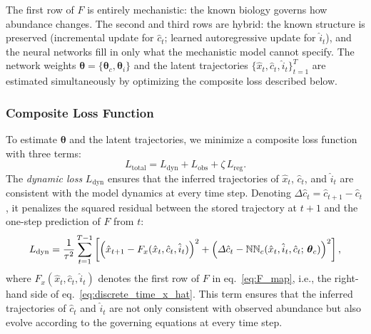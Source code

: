 \documentclass[openacc]{rsproca_new}%
\newcommand{\bs}[1]{\boldsymbol{#1}}
\begin{document}
%
The first row of $F$ is entirely mechanistic: the known biology governs how abundance changes. The second and third rows are hybrid: the known structure is preserved (incremental update for $\hat{c}_t$; learned autoregressive update for $\hat{i}_t$), and the neural networks fill in only what the mechanistic model cannot specify.
The network weights $\bs{\theta} = \{\bs{\theta}_c, \bs{\theta}_i\}$ and the latent trajectories $\{\hat{x}_t, \hat{c}_t, \hat{i}_t\}_{t=1}^{T}$ are estimated simultaneously by optimizing the composite loss described below.
% 
% 
\subsubsection*{Composite Loss Function}
To estimate $\bs{\theta}$ and the latent trajectories, we minimize a
composite loss function with three terms:
%
\begin{equation}
    L_{\mathrm{total}}
        = L_{\mathrm{dyn}} + L_{\mathrm{obs}} + \zeta\,L_{\mathrm{reg}}.
    \label{eq:UDE_Ltotal}
\end{equation}
%
The \textit{dynamic loss} $L_{\mathrm{dyn}}$ ensures that the inferred trajectories of $\hat{x}_t$, $\hat{c}_t$, and $\hat{i}_t$ are consistent with the model dynamics at every time step. Denoting $\Delta\hat{c}_t = \hat{c}_{t+1} - \hat{c}_t$, it penalizes the squared residual between the stored trajectory at $t+1$ and the one-step prediction of $F$ from $t$:
%
\begin{equation}
    L_{\mathrm{dyn}}
        = \frac{1}{\tau^2} \sum_{t=1}^{T-1}
          \left[
              \Bigl(\hat{x}_{t+1} - F_x(\hat{x}_t,\hat{c}_t,\hat{i}_t)\Bigr)^2
            + \Bigl(\Delta\hat{c}_t
                    - \mathbb{NN}_c(\hat{x}_t,\hat{i}_t,\hat{c}_t;\,\bs{\theta}_c)
              \Bigr)^2
          \right],
    \label{eq:UDE_Ldyn}
\end{equation}
%
where $F_x(\hat{x}_t, \hat{c}_t, \hat{i}_t)$ denotes the first row of $F$ in eq.~\eqref{eq:F_map}, i.e., the right-hand side of eq.~\eqref{eq:discrete_time_x_hat}. This term ensures that the inferred trajectories of $\hat{c}_t$ and $\hat{i}_t$ are not only consistent with observed abundance but also evolve according to the governing equations at every time step.
\end{document}
